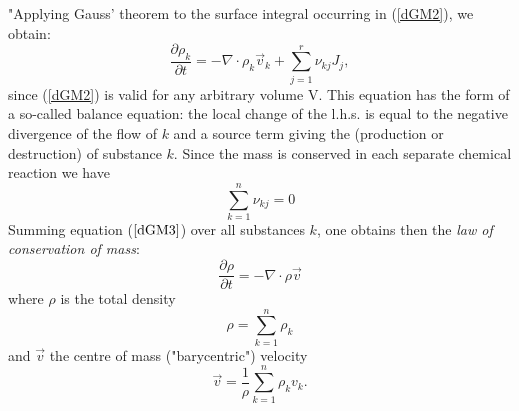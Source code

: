 "Applying Gauss' theorem to the surface integral occurring in (\ref{dGM2}), we obtain:
\begin{equation}
\frac{\partial \rho_k}{\partial t} = - \nabla \cdot \rho_k \vec{v}_k + \sum_{j=1}^r \nu_{kj} J_j,
\label{dGM3}
\end{equation}
since (\ref{dGM2}) is valid for any arbitrary volume V. This equation has the form of a so-called balance equation: the local change of the l.h.s. is equal to the negative divergence of the flow of $k$ and a source term giving the (production or destruction) of substance $k$.
Since the mass is conserved in each separate chemical reaction we have
\begin{equation}
\sum_{k=1}^n \nu_{kj}= 0 
\label{dGM4}
\end{equation}
Summing equation ($\ref{dGM3}$) over all substances $k$, one obtains then the {\it law of conservation of mass}:
\begin{equation}
\frac{\partial \rho}{\partial t} = - \nabla \cdot \rho \vec{v}
\label{dGM5}
\end{equation}
where $\rho$ is the total density
\begin{equation}
\rho = \sum_{k=1}^n \rho_k
\label{dGM6}
\end{equation}
and $\vec{v}$ the centre of mass ("barycentric") velocity
\begin{equation}
\vec{v} = \frac{1}{\rho} \sum_{k=1}^n \rho_k v_k.
\label{dGM7}
\end{equation}
